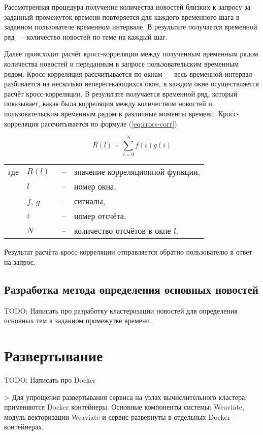 Рассмотренная процедура получение количества новостей близких к запросу за заданный промежуток времени повторяется для каждого временного шага в заданном пользователе временном интервале. В результате получается временной ряд ~-- количество новостей по теме на каждый шаг.

Далее происходит расчёт кросс-корреляции между полученным временным рядом количества новостей и переданным в запросе пользовательским временным рядом. Кросс-корреляция рассчитывается по окнам ~-- весь временной интервал разбивается на несколько непересекающихся окон, в каждом окне осуществляется расчёт кросс-корреляции. В результате получается временной ряд, который показывает, какая была корреляция между количеством новостей и пользовательским временным рядом в различные моменты времени. Кросс-корреляция рассчитывается по формуле (\ref{eq:cross-corr}).

\begin{equation}
    R(l) = \sum_{i=0}^N{f(i)g(i)}
    \label{eq:cross-corr}
\end{equation}

\noindent\begin{tabularx}{\linewidth}{lllX}
    где & $R(l)$   &~--& значение корреляционной функции, \\
        & $l$      &~--& номер окна, \\
        & $f$, $g$ &~--& сигналы, \\
        & $i$      &~--& номер отсчёта, \\
        & $N$      &~--& количество отсчётов в окне $l$. \\
\end{tabularx}

Результат расчёта кросс-корреляции отправляется обратно пользователю в ответ на запрос.

\subsection{Разработка метода определения основных новостей}

TODO: Написать про разработку кластеризации новостей для определения основных тем в заданном промежутке времени.


\section{Развертывание}

TODO: Написать про Docker


> Для упрощения развертывания сервиса на узлах вычислительного кластера, применяются Docker контейнеры. Основные компоненты системы: Weaviate, модуль векторизации Weaviate и сервис развернуты в отдельных Docker-контейнерах.
